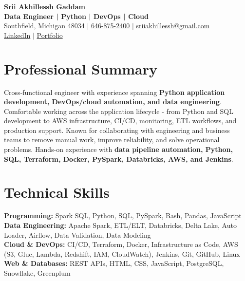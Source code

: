 \documentclass[letterpaper,10pt]{article}
\begin{document}
\fontsize{9.35pt}{10.45pt}\selectfont

\begin{center}
    {\LARGE \textbf{Srii Akhillessh Gaddam}} \\[-1pt]
    \textbf{Data Engineer | Python | DevOps | Cloud} \\[2pt]
    Southfield, Michigan 48034 $|$
    \href{tel:6468752400}{646-875-2400} $|$
    \href{mailto:sriiakhillessh@gmail.com}{sriiakhillessh@gmail.com} \\[1pt]
    \href{https://www.linkedin.com/in/srii-akhiilessh-gaddam-b48668191/}{LinkedIn} $|$
    \href{https://sriiakhillesshg.github.io/portfolio/}{Portfolio}
\end{center}
\vspace{-8pt}

\section{Professional Summary}
\small{Cross-functional engineer with experience spanning \textbf{Python application development, DevOps/cloud automation, and data engineering}. Comfortable working across the application lifecycle - from Python and SQL development to AWS infrastructure, CI/CD, monitoring, ETL workflows, and production support. Known for collaborating with engineering and business teams to remove manual work, improve reliability, and solve operational problems. Hands-on experience with \textbf{data pipeline automation, Python, SQL, Terraform, Docker, PySpark, Databricks, AWS, and Jenkins}.}

\section{Technical Skills}
\small{
\textbf{Programming:} Spark SQL, Python, SQL, PySpark, Bash, Pandas, JavaScript \\
\textbf{Data Engineering:} Apache Spark, ETL/ELT, Databricks, Delta Lake, Auto Loader, Airflow, Data Validation, Data Modeling \\
\textbf{Cloud \& DevOps:} CI/CD, Terraform, Docker, Infrastructure as Code, AWS (S3, Glue, Lambda, Redshift, IAM, CloudWatch), Jenkins, Git, GitHub, Linux \\
\textbf{Web \& Databases:} REST APIs, HTML, CSS, JavaScript, PostgreSQL, Snowflake, Greenplum
}
\end{document}
